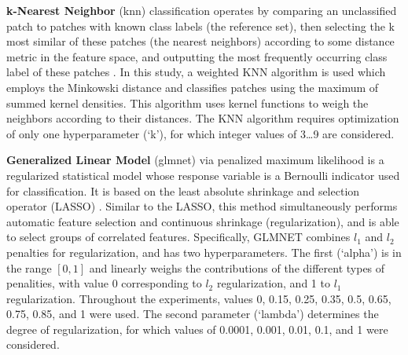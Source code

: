 {\bf k-Nearest Neighbor} (\gls{knn}) classification operates by comparing an unclassified patch to patches with known class labels (the reference set), then selecting the k most similar of these patches (the nearest neighbors) according to some distance metric in the feature space, and outputting the most frequently occurring class label of these patches \cite{cover1967nearest}. In this study, a weighted KNN algorithm is used \cite{hechenbichler2004weighted, samworth2012optimal} which employs the Minkowski distance and classifies patches using the maximum of summed kernel densities. This algorithm uses kernel functions to weigh the neighbors according to their distances. The KNN algorithm requires optimization of only one hyperparameter (`k'), for which integer values of 3\dots9 are considered.

{\bf Generalized Linear Model} (\gls{glmnet}) via penalized maximum likelihood \cite{friedman2010regularization} is a regularized statistical model whose response variable is a Bernoulli indicator used for classification. It is based on the least absolute shrinkage and selection operator (LASSO) \cite{tibshirani1996regression}. Similar to the LASSO, this method simultaneously performs automatic feature selection and continuous shrinkage (regularization), and is able to select groups of correlated features. Specifically, GLMNET combines $l_1$ and $l_2$ penalties for regularization, and has two hyperparameters. The first (`alpha') is in the range $[0,1]$ and linearly weighs the contributions of the different types of penalities, with value 0 corresponding to $l_2$ regularization, and 1 to $l_1$ regularization. Throughout the experiments, values 0, 0.15, 0.25, 0.35, 0.5, 0.65, 0.75, 0.85, and 1 were used. The second parameter (`lambda') determines the degree of regularization, for which values of 0.0001, 0.001, 0.01, 0.1, and 1 were considered.

